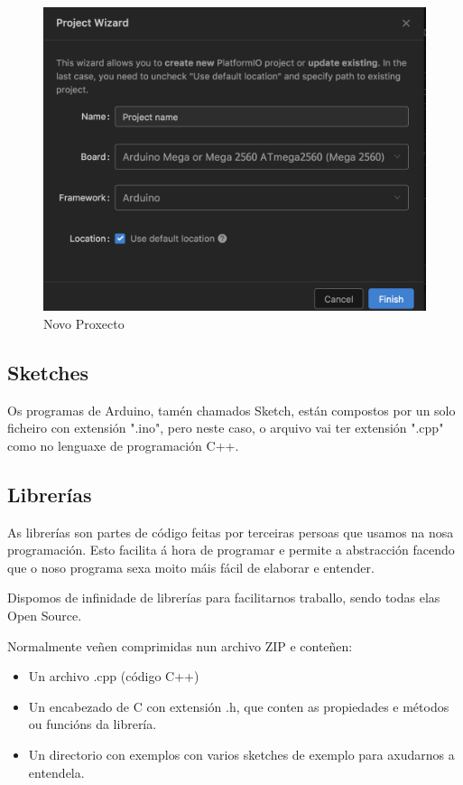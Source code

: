 \documentclass[11pt,twoside]{book}
\begin{document}
\begin{figure}[H]
	\begin{center}
		\includegraphics[width=15cm]{images/NewProject.png}
	\end{center}
	\caption{Novo Proxecto}
	\label{fig:NewProject}
\end{figure}

\subsection{Sketches}

Os programas de Arduino, tamén chamados Sketch, están compostos por un solo ficheiro con extensión ".ino", pero neste caso, o arquivo vai ter extensión ".cpp" como no lenguaxe de programación C++.

\subsection{Librerías}

As librerías son partes de código feitas por terceiras persoas que usamos na nosa programación. Esto facilita á hora de programar e permite a abstracción facendo que o noso programa sexa moito máis fácil de elaborar e entender.

Dispomos de infinidade de librerías para facilitarnos traballo, sendo todas elas Open Source.

Normalmente veñen comprimidas nun archivo ZIP e conteñen:
\begin{itemize}
\item Un archivo .cpp (código C++)
\item Un encabezado de C con extensión .h, que conten as propiedades e métodos ou funcións da librería.
\item Un directorio con exemplos con varios sketches de exemplo para axudarnos a entendela.
\end{itemize}
\end{document}
